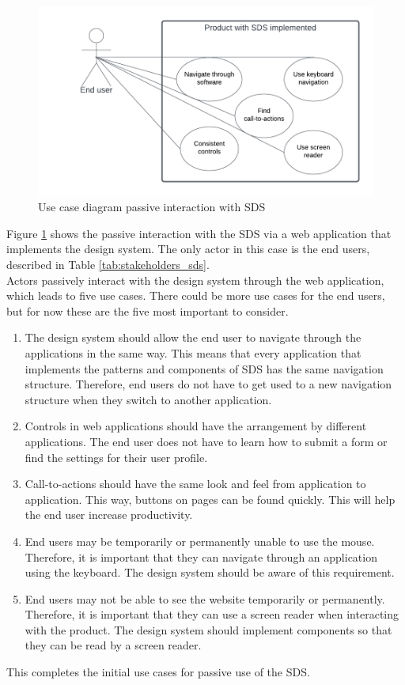 \begin{figure}[htbp]
    \centerline{\includegraphics[width=\linewidth]{images/use_case_diagram_passive.png}}
    \caption{Use case diagram passive interaction with \ac{SDS}}
    \label{use_case_passive}
\end{figure}
Figure \ref{use_case_passive} shows the passive interaction with the SDS via a web application that implements the design system. The only actor in this case is the end users, described in Table \ref{tab:stakeholders_sds}. \\ 
Actors passively interact with the design system through the web application, which leads to five use cases. There could be more use cases for the end users, but for now these are the five most important to consider. \\
\begin{enumerate}
    \item The design system should allow the end user to navigate through the applications in the same way. This means that every application that implements the patterns and components of SDS has the same navigation structure. Therefore, end users do not have to get used to a new navigation structure when they switch to another application.
    \item Controls in web applications should have the arrangement by different applications. The end user does not have to learn how to submit a form or find the settings for their user profile.
    \item Call-to-actions should have the same look and feel from application to application. This way, buttons on pages can be found quickly. This will help the end user increase productivity.
    \item End users may be temporarily or permanently unable to use the mouse. Therefore, it is important that they can navigate through an application using the keyboard. The design system should be aware of this requirement.
    \item End users may not be able to see the website temporarily or permanently. Therefore, it is important that they can use a screen reader when interacting with the product. The design system should implement components so that they can be read by a screen reader.
\end{enumerate}
This completes the initial use cases for passive use of the SDS. \\

